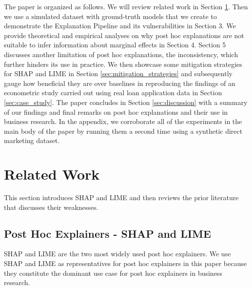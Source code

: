 \documentclass[mnsc,blindrev]{informs3}
\begin{document}
    The paper is organized as follows. We will review related work in Section \ref{sec:related_work}. Then we use a simulated dataset with ground-truth models that we create to demonstrate the Explanation Pipeline and its vulnerabilities in Section 3.  We provide theoretical and empirical analyses on why post hoc explanations are not suitable to infer information about marginal effects in Section 4. Section 5 discusses another limitation of post hoc explanations, the inconsistency, which further hinders its use in practice. We then showcase some mitigation strategies for SHAP and LIME in Section \ref{sec:mitigation_strategies} and subsequently gauge how beneficial they are over baselines in reproducing the findings of an econometric study carried out using real loan application data in Section \ref{sec:case_study}. The paper concludes in Section \ref{sec:discussion} with a summary of our findings and final remarks on post hoc explanations and their use in business research. In the appendix, we corroborate all of the experiments in the main body of the paper by running them a second time using a synthetic direct marketing dataset. 
    
\section{Related Work}
    \label{sec:related_work}
    This section introduces SHAP and LIME and then reviews the prior literature that discusses their weaknesses. %

    \subsection{Post Hoc Explainers - SHAP and LIME}
     SHAP \citep{lundberg17shap} and LIME \citep{ribeiro16lime}  are the two most widely used post hoc explainers. %
        We use SHAP and LIME as representatives for post hoc explainers in this paper because they constitute the dominant use case for post hoc explainers in business research.
\end{document}
